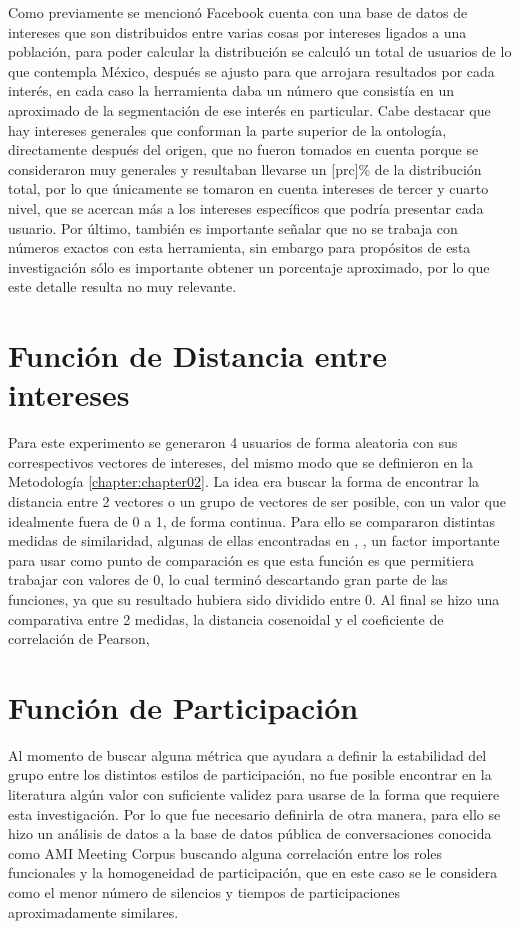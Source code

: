Como previamente se mencionó Facebook cuenta con una base de datos de intereses que son distribuidos entre varias cosas por intereses ligados a una población, para poder calcular la distribución se calculó un total de usuarios de lo que contempla México, después se ajusto para que arrojara resultados por cada interés, en cada caso la herramienta daba un número que consistía en un aproximado de la segmentación de ese interés en particular. Cabe destacar que hay intereses generales que conforman la parte superior de la ontología, directamente después del origen, que no fueron tomados en cuenta porque se consideraron muy generales y resultaban llevarse un [prc]\% de la distribución total, por lo que únicamente se tomaron en cuenta intereses de tercer y cuarto nivel, que se acercan más a los intereses específicos que podría presentar cada usuario. Por último, también es importante señalar que no se trabaja con números exactos con esta herramienta, sin embargo para propósitos de esta investigación sólo es importante obtener un porcentaje aproximado, por lo que este detalle resulta no muy relevante.

\section{Función de Distancia entre intereses}

Para este experimento se generaron 4 usuarios de forma aleatoria con sus correspectivos vectores de intereses, del mismo modo que se definieron en la Metodología \ref{chapter:chapter02}. La idea era buscar la forma de encontrar la distancia entre 2 vectores o un grupo de vectores de ser posible, con un valor que idealmente fuera de 0 a 1, de forma continua. Para ello se compararon distintas medidas de similaridad, algunas de ellas encontradas en \cite{SeyedShirkhorshidi2015AData}, \cite{Sung-HyukChaComprehensiveFunctions}, un factor importante para usar como punto de comparación es que esta función es que permitiera trabajar con valores de 0, lo cual terminó descartando gran parte de las funciones, ya que su resultado hubiera sido dividido entre 0. Al final se hizo una comparativa entre 2 medidas, la distancia cosenoidal y el coeficiente de correlación de Pearson, 


\section{Función de Participación}

Al momento de buscar alguna métrica que ayudara a definir la estabilidad del grupo entre los distintos estilos de participación, no fue posible encontrar en la literatura algún valor con suficiente validez para usarse de la forma que requiere esta investigación. Por lo que fue necesario definirla de otra manera, para ello se hizo un análisis de datos a la base de datos pública de conversaciones conocida como AMI Meeting Corpus buscando alguna correlación entre los roles funcionales y la homogeneidad de participación, que en este caso se le considera como el menor número de silencios y tiempos de participaciones aproximadamente similares.

